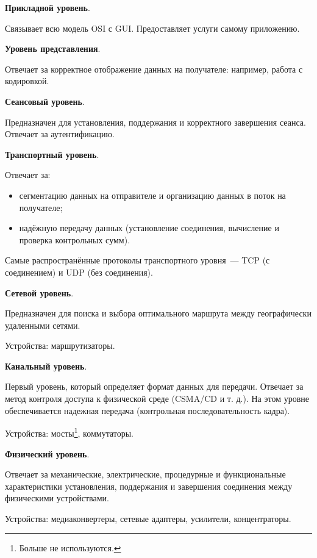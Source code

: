 \begin{etaremune}
    \item \textbf{Прикладной уровень}.

    Связывает всю модель OSI с GUI. Предоставляет услуги самому приложению.

    \item \textbf{Уровень представления}.

    Отвечает за корректное отображение данных на получателе: например, работа с кодировкой.

    \item \textbf{Сеансовый уровень}.

    Предназначен для установления, поддержания и корректного завершения сеанса. Отвечает за аутентификацию.

    \pagebreak
    \item \textbf{Транспортный уровень}.

    Отвечает за:

    \begin{itemize}
        \item сегментацию данных на отправителе и организацию данных в поток на получателе;
        \item надёжную передачу данных (установление соединения, вычисление и проверка контрольных сумм).
    \end{itemize}

    Самые распространённые протоколы транспортного уровня~--- \textsc{TCP} (с соединением) и \textsc{UDP} (без соединения).

    \item \textbf{Сетевой уровень}.

    Предназначен для поиска и выбора оптимального маршрута между географически удаленными сетями.

    Устройства: маршрутизаторы.

    \item \textbf{Канальный уровень}.

    Первый уровень, который определяет формат данных для передачи. Отвечает за метод контроля доступа к физической среде (CSMA/CD и т. д.). На этом уровне обеспечивается надежная передача (контрольная последовательность кадра).

    Устройства: мосты\footnote{Больше не используются.}, коммутаторы.

    \item \textbf{Физический уровень}.

    Отвечает за механические, электрические, процедурные и функциональные характеристики установления, поддержания и завершения соединения между физическими устройствами.

    Устройства: медиаконвертеры, сетевые адаптеры, усилители, концентраторы.
\end{etaremune}